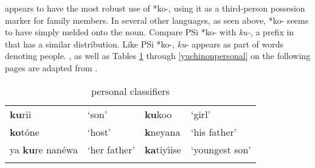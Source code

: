 \documentclass[output=paper]{LSP/langsci}
\begin{document}
\begin{table} 
\end{table}

 appears to have the most robust use of *ko-, using it as a third-person possesion marker for family members. In several other languages, as seen above, *ko- seems to have simply melded onto the noun. Compare PSi *ko- with \emph{ku-}, a prefix in  that has a similar distribution. Like PSi *ko-,  \emph{ku}- appears as part of words denoting people. , as well as Tables \ref{catawbaclassifiers} through \ref{yuchinonpersonal} on the following pages are adapted from \citet{Rankin1998scy}.

\begin{table}  
\caption{ personal classifiers} \label{catawbaclassifiers}
    \begin{tabularx}{.75\textwidth}{XXXX}\lsptoprule
        \textbf{ku}rii & `son' & \textbf{ku}koo & `girl' \\ 
        \textbf{ko}t\'one & `host' & \textbf{k\textipa{@}}neyana & `his father' \\ 
			{ya \textbf{ku}re nan\'ewa} & `her father' & {\textbf{ka}tiy\'\i ise} & `youngest son' \\
\lspbottomrule
    \end{tabularx} 
\end{table}

\begin{table} 

\end{table}
\end{document}
